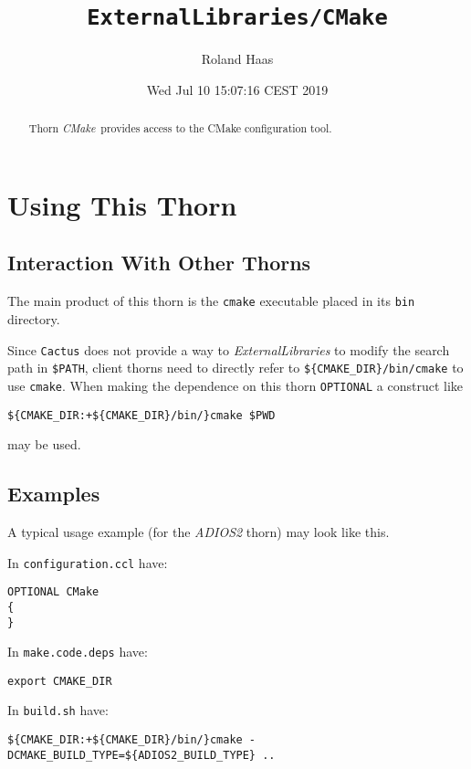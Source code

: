 \documentclass{article}
\begin{document}
\title{\tt ExternalLibraries/CMake}
\author{Roland Haas}
\date{ Wed Jul 10 15:07:16 CEST 2019 }

\maketitle


\ifx\ThisThorn\undefined
\newcommand{\ThisThorn}{{\it CMake}}
\else
\renewcommand{\ThisThorn}{{\it CMake}}
\fi

\begin{abstract}
Thorn \ThisThorn\ provides access to the CMake configuration tool.
\end{abstract}

\section{Using This Thorn}
\subsection{Interaction With Other Thorns}
The main product of this thorn is the \texttt{cmake} executable placed in its
\texttt{bin} directory.

Since \texttt{Cactus} does not provide a way to \textit{ExternalLibraries} to
modify the search path in \verb|$PATH|, client thorns need to directly refer
to \verb|${CMAKE_DIR}/bin/cmake| to use \texttt{cmake}. When making the
dependence on this thorn \verb|OPTIONAL| a construct like

\begin{verbatim}
${CMAKE_DIR:+${CMAKE_DIR}/bin/}cmake $PWD
\end{verbatim}

may be used.

\subsection{Examples}

A typical usage example (for the \textit{ADIOS2} thorn) may look like this.

In \texttt{configuration.ccl} have:

\begin{verbatim}
OPTIONAL CMake
{
}
\end{verbatim}

In \texttt{make.code.deps} have:

\begin{verbatim}
export CMAKE_DIR
\end{verbatim}

In \texttt{build.sh} have:

\begin{verbatim}
${CMAKE_DIR:+${CMAKE_DIR}/bin/}cmake -DCMAKE_BUILD_TYPE=${ADIOS2_BUILD_TYPE} ..
\end{verbatim}

\end{document}
